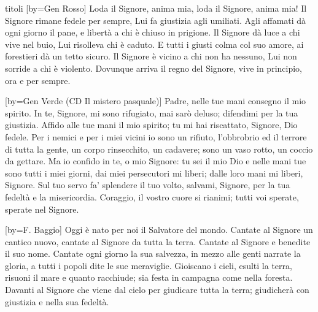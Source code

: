 \begin{songs}{titoli}
[by={Gen Rosso}]
\beginchorus
Loda il Signore, anima mia,
loda il Signore, anima mia! 
\endchorus
\beginverse
Il Signore rimane fedele per sempre,
Lui fa giustizia agli umiliati.
Agli affamati dà ogni giorno il pane,
e libertà a chi è chiuso in prigione.
\endverse
\beginverse
Il Signore dà luce a chi vive nel buio,
Lui risolleva chi è caduto.
E tutti i giusti colma col suo amore,
ai forestieri dà un tetto sicuro.
\endverse
\beginverse
Il Signore è vicino a chi non ha nessuno,
Lui non sorride a chi è violento.
Dovunque arriva il regno del Signore,
vive in principio, ora e per sempre.
\endverse
\endsong

[by={Gen Verde (CD Il mistero pasquale)}]
\beginchorus
Padre, nelle tue mani consegno il mio spirito.
\endchorus
\beginverse
In te, Signore, mi sono rifugiato,
mai sarò deluso;
difendimi per la tua giustizia.
Affido alle tue mani il mio spirito;
tu mi hai riscattato, Signore, Dio fedele.
\endverse
\beginverse
Per i nemici e per i miei vicini
io sono un rifiuto,
l'obbrobrio ed il terrore di tutta la gente,
un corpo rinsecchito, un cadavere;
sono un vaso rotto, un coccio da gettare.
\endverse
\beginverse
Ma io confido in te, o mio Signore:
tu sei il mio Dio
e nelle mani tue sono tutti i miei giorni,
dai miei persecutori mi liberi;
dalle loro mani mi liberi, Signore.
\endverse
\beginverse
Sul tuo servo fa' splendere il tuo volto,
salvami, Signore,
per la tua fedeltà e la misericordia.
Coraggio, il vostro cuore si rianimi;
tutti voi sperate, sperate nel Signore.
\endverse
\endsong

[by={F. Baggio}]
\beginchorus
Oggi è nato per noi il Salvatore del mondo. 
\endchorus
\beginverse
Cantate al Signore un cantico nuovo,
cantate al Signore da tutta la terra.
Cantate al Signore e benedite il suo nome.
\endverse
\beginverse
Cantate ogni giorno la sua salvezza,
in mezzo alle genti narrate la gloria,
a tutti i popoli dite le sue meraviglie.
\endverse
\beginverse
Gioiscano i cieli, esulti la terra,
risuoni il mare e quanto racchiude;
sia festa in campagna come nella foresta.
\endverse
\beginverse
Davanti al Signore che viene dal cielo
per giudicare tutta la terra;
giudicherà con giustizia e nella sua fedeltà.
\endverse
\endsong


\end{songs}
